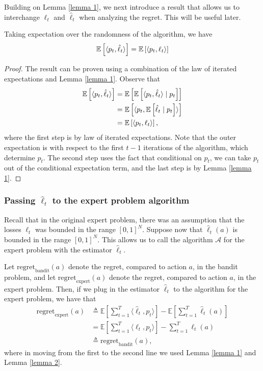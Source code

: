 \documentclass[11pt]{article}
\begin{document}
Building on Lemma \ref{lemma 1}, we next introduce a result that allows us to interchange $\ell_t$ and $\hat{\ell}_t$ when analyzing the regret. This will be useful later.

\begin{lemma}\label{lemma 2}
Taking expectation over the randomness of the algorithm, we have
    $$\mathbb{E} \left[\langle p_t, \hat{\ell}_t \rangle \right] = \mathbb{E} \left[\langle p_t, \ell_t \rangle \right]$$ 
\end{lemma}

\begin{proof}
The result can be proven using a combination of the law of iterated expectations and Lemma \ref{lemma 1}. Observe that
    \begin{align*}
        \mathbb{E} \left[\langle p_t, \hat{\ell}_t \rangle \right] &=
         \mathbb{E} \left [ \mathbb{E} \left[ \langle p_t, \hat{\ell}_t \rangle  \mid p_t \right] \right ]\\
        &=  \mathbb{E} \left [ \langle p_t , \mathbb{E} \left[ \hat{\ell}_t  \mid p_t \right]  \rangle\right] \\
        &= \mathbb{E} \left[\langle p_t, \ell_t \rangle \right],
    \end{align*}
    where the first step is by law of iterated expectations. Note that the outer expectation is with respect to the first $t-1$ iterations of the algorithm, which determine $p_t$. The second step uses the fact that conditional on $p_t$, we can take $p_t$ out of the conditional expectation term, and the last step is by Lemma \ref{lemma 1}. 
\end{proof}
\subsubsection{Passing $\hat{\ell}_t$ to the expert problem algorithm}

Recall that in the original expert problem, there was an assumption that the losses $\ell_t$ was bounded in the range $[0,1]^N$. Suppose now that $\hat{\ell}_t(a)$ is bounded in the range $[0,1]^N$. This allows us to call the algorithm $\mathcal{A}$ for the expert problem with the estimator $\hat{\ell}_t$.

Let $\text{regret}_{\text{bandit}}(a)$ denote the regret, compared to action $a$, in the bandit problem, and let $\text{regret}_{\text{expert}}(a)$ denote the regret, compared to action $a$, in the expert problem. Then, if we plug in the estimator $\hat{\ell}_t$ to the algorithm for the expert problem, we have that 
\begin{align*}
\text{regret}_{\text{expert}}(a) &\triangleq \mathbb{E}\left[\sum_{t=1}^T \langle \hat{\ell}_t, p_t \rangle \right] - \mathbb{E}\left[\sum_{t=1}^T \hat{\ell}_t(a) \right] \\
&= \mathbb{E} \left[\sum_{t=1}^T \langle \ell_t, p_t \rangle \right] - \sum_{t=1}^T \ell_t(a) \\
    &\triangleq \text{regret}_{\text{bandit}}(a),
\end{align*}
where in moving from the first to the second line we used Lemma \ref{lemma 1} and Lemma \ref{lemma 2}. 
\end{document}

